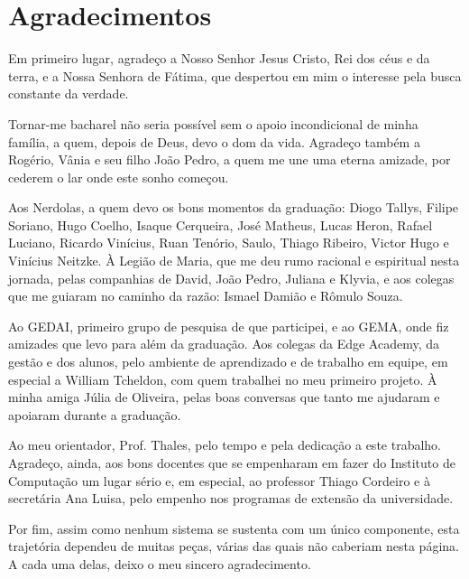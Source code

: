 \chapter*{Agradecimentos}

Em primeiro lugar, agradeço a Nosso Senhor Jesus Cristo, Rei dos céus e da terra, e a Nossa Senhora de Fátima, que despertou em mim o interesse pela busca constante da verdade.

Tornar-me bacharel não seria possível sem o apoio incondicional de minha família, a quem, depois de Deus, devo o dom da vida. Agradeço também a Rogério, Vânia e seu filho João Pedro, a quem me une uma eterna amizade, por cederem o lar onde este sonho começou.

Aos Nerdolas, a quem devo os bons momentos da graduação: Diogo Tallys, Filipe Soriano, Hugo Coelho, Isaque Cerqueira, José Matheus, Lucas Heron, Rafael Luciano, Ricardo Vinícius, Ruan Tenório, Saulo, Thiago Ribeiro, Victor Hugo e Vinícius Neitzke. À Legião de Maria, que me deu rumo racional e espiritual nesta jornada, pelas companhias de David, João Pedro, Juliana e Klyvia, e aos colegas que me guiaram no caminho da razão: Ismael Damião e Rômulo Souza.

Ao GEDAI, primeiro grupo de pesquisa de que participei, e ao GEMA, onde fiz amizades que levo para além da graduação. Aos colegas da Edge Academy, da gestão e dos alunos, pelo ambiente de aprendizado e de trabalho em equipe, em especial a William Tcheldon, com quem trabalhei no meu primeiro projeto. À minha amiga Júlia de Oliveira, pelas boas conversas que tanto me ajudaram e apoiaram durante a graduação.

Ao meu orientador, Prof. Thales, pelo tempo e pela dedicação a este trabalho. Agradeço, ainda, aos bons docentes que se empenharam em fazer do Instituto de Computação um lugar sério e, em especial, ao professor Thiago Cordeiro e à secretária Ana Luisa, pelo empenho nos programas de extensão da universidade.

Por fim, assim como nenhum sistema se sustenta com um único componente, esta trajetória dependeu de muitas peças, várias das quais não caberiam nesta página. A cada uma delas, deixo o meu sincero agradecimento.


\begin{minipage}{.45\linewidth}
\begin{flushleft}
\end{flushleft}
\end{minipage}
\begin{minipage}{.45\linewidth}
\end{minipage}